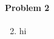\documentclass[12pt, oneside, letterpaper, fleqn]{article}
\begin{document}
\paragraph{Problem 2}
\begin{enumerate}
\setcounter{enumi}{1}
\item hi
\end{enumerate}
\end{document}

